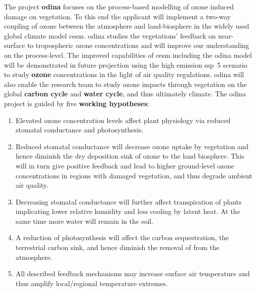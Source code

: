 The project \textbf{\gls{odina}} focuses on the process-based modelling of ozone induced damage on vegetation. To this end the applicant will implement a two-way coupling of ozone between the atmosphere and land-biosphere in the widely used global climate model \gls{cesm}. \gls{odina} studies the vegetations' feedback on near-surface to tropospheric ozone concentrations and will improve our understanding on the process-level. The improved capabilities of \gls{cesm} including the \gls{odina} model will be demonstrated in future projection using the high emission \gls{ssp}~5 scenario to study \textbf{\color{red}ozone} concentrations in the light of air quality regulations. \gls{odina} will also enable the research team to study ozone impacts through vegetation on the global \textbf{\color{darkgray}carbon cycle} and \textbf{\color{blue}water cycle}, and thus ultimately climate.
The \gls{odina} project is guided by five \textbf{working hypotheses}: 

\begin{enumerate}
\itemsep0pt
\item Elevated ozone concentration levels affect plant physiology via reduced stomatal conductance and photosynthesis. 
\item Reduced stomatal conductance will decrease ozone uptake by vegetation and hence diminish the dry deposition sink of ozone to the land biosphere. This will in turn give positive feedback and lead to higher ground-level ozone concentrations in regions with damaged vegetation, and thus degrade ambient air quality.
\item Decreasing stomatal conductance will further affect transpiration of plants implicating lower relative humidity and less cooling by latent heat. At the same time more water will remain in the soil.
\item A reduction of photosynthesis will affect the carbon sequestration, the terrestrial carbon sink, and hence diminish the removal of  from the atmosphere.
\item All described feedback mechanisms may increase surface air temperature and thus amplify local/regional temperature extremes.
\end{enumerate}


